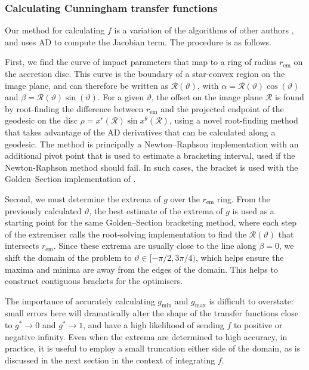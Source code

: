 \documentclass[fleqn,usenatbib]{mnras}
\newcommand{\rhoem}{r_\text{em}}
\begin{document}
\subsubsection{Calculating Cunningham transfer functions}

Our method for calculating $f$ is a variation of the algorithms of other authors
\citep{speith_photon_1995,bambi_testing_2017,abdikamalov_public_2019}, and uses
AD to compute the Jacobian term. The procedure is as follows.

First, we find the curve of impact parameters that map to a ring of radius
$\rhoem$ on the accretion disc. This curve is the boundary of a star-convex
region on the image plane, and can therefore be written as
$\mathcal{R}(\vartheta)$, with $\alpha = \mathcal{R}(\vartheta) \cos(\vartheta)$
and $\beta = \mathcal{R}(\vartheta) \sin(\vartheta)$. For a given $\vartheta$,
the offset on the image plane $\mathcal{R}$ is found by root-finding the
difference between $\rhoem$ and the projected endpoint of the geodesic on
the disc $\rho = x^r (\mathcal{R}) \sin x^\theta(\mathcal{R})$, using a novel
root-finding method that takes advantage of the AD derivatives that can be
calculated along a geodesic. The method is principally a Newton--Raphson
implementation with an additional pivot point that is used to estimate a
bracketing interval, used if the Newton-Raphson method should fail. In such
cases, the bracket is used with the Golden--Section implementation of
\citep{Optim.jl-2018}.

Second, we must determine the extrema of $g$ over the $\rhoem$ ring. From the
previously calculated $\vartheta$, the best estimate of the extrema of $g$ is
used as a starting point for the same Golden--Section bracketing method, where
each step of the extremiser calls the root-solving implementation to find the
$\mathcal{R}(\vartheta)$ that intersects $\rhoem$. Since these extrema are
usually close to the line along $\beta = 0$, we shift the domain of the problem
to $\vartheta \in [ -\pi/2, 3\pi/4)$, which helps ensure the maxima and minima
are away from the edges of the domain. This helps to construct contiguous
brackets for the optimisers.

The importance of accurately calculating $g_\text{min}$ and $g_\text{max}$ is
difficult to overstate: small errors here will dramatically alter the shape of
the transfer functions close to $g^\ast \rightarrow 0$ and $g^\ast \rightarrow
1$, and have a high likelihood of sending $f$ to positive or negative infinity.
Even when the extrema are determined to high accuracy, in practice, it is useful
to employ a small truncation either side of the domain, as is discussed in the
next section in the context of integrating $f$.
\end{document}
